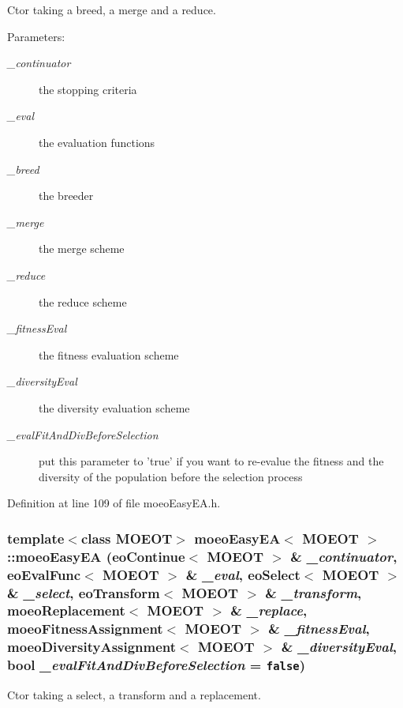 Ctor taking a breed, a merge and a reduce. 

\begin{Desc}
\item[Parameters:]
\begin{description}
\item[{\em \_\-continuator}]the stopping criteria \item[{\em \_\-eval}]the evaluation functions \item[{\em \_\-breed}]the breeder \item[{\em \_\-merge}]the merge scheme \item[{\em \_\-reduce}]the reduce scheme \item[{\em \_\-fitness\-Eval}]the fitness evaluation scheme \item[{\em \_\-diversity\-Eval}]the diversity evaluation scheme \item[{\em \_\-eval\-Fit\-And\-Div\-Before\-Selection}]put this parameter to 'true' if you want to re-evalue the fitness and the diversity of the population before the selection process \end{description}
\end{Desc}


Definition at line 109 of file moeo\-Easy\-EA.h.
\subsubsection{\setlength{\rightskip}{0pt plus 5cm}template$<$class MOEOT$>$ \bf{moeo\-Easy\-EA}$<$ MOEOT $>$::\bf{moeo\-Easy\-EA} (\bf{eo\-Continue}$<$ MOEOT $>$ \& {\em \_\-continuator}, \bf{eo\-Eval\-Func}$<$ MOEOT $>$ \& {\em \_\-eval}, \bf{eo\-Select}$<$ MOEOT $>$ \& {\em \_\-select}, \bf{eo\-Transform}$<$ MOEOT $>$ \& {\em \_\-transform}, \bf{moeo\-Replacement}$<$ MOEOT $>$ \& {\em \_\-replace}, \bf{moeo\-Fitness\-Assignment}$<$ MOEOT $>$ \& {\em \_\-fitness\-Eval}, \bf{moeo\-Diversity\-Assignment}$<$ MOEOT $>$ \& {\em \_\-diversity\-Eval}, bool {\em \_\-eval\-Fit\-And\-Div\-Before\-Selection} = {\tt false})\hspace{0.3cm}{\tt  [inline]}}\label{classmoeoEasyEA_27f0db7a608636c904305afa11cd6ae1}


Ctor taking a select, a transform and a replacement. 

